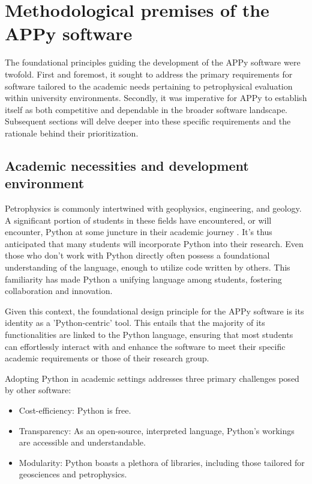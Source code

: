 \documentclass[10pt,twocolumn,twoside]{article}
\begin{document}
\section{Methodological premises of the APPy software}
The foundational principles guiding the development of the APPy software were twofold. First and foremost, it sought to address the primary requirements for software tailored to the academic needs pertaining to petrophysical evaluation within university environments. Secondly, it was imperative for APPy to establish itself as both competitive and dependable in the broader software landscape. Subsequent sections will delve deeper into these specific requirements and the rationale behind their prioritization.

\subsection{Academic necessities and development environment}
Petrophysics is commonly intertwined with geophysics, engineering, and geology. A significant portion of students in these fields have encountered, or will encounter, Python at some juncture in their academic journey \citep{guo2014}. It's thus anticipated that many students will incorporate Python into their research. Even those who don't work with Python directly often possess a foundational understanding of the language, enough to utilize code written by others. This familiarity has made Python a unifying language among students, fostering collaboration and innovation.

Given this context, the foundational design principle for the APPy software is its identity as a 'Python-centric' tool. This entails that the majority of its functionalities are linked to the Python language, ensuring that most students can effortlessly interact with and enhance the software to meet their specific academic requirements or those of their research group.

Adopting Python in academic settings addresses three primary challenges posed by other software:

\begin{itemize}
	\item Cost-efficiency: Python is free.
	\item Transparency: As an open-source, interpreted language, Python's workings are accessible and understandable.
	\item Modularity: Python boasts a plethora of libraries, including those tailored for geosciences and petrophysics.
\end{itemize}
\end{document}
